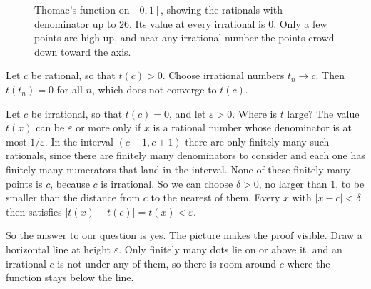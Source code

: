 \begin{figure}
\centering
{}
\caption{Thomae's function on $[0,1]$, showing the rationals with denominator up to $26$.  Its value at every irrational is $0$.  Only a few points are high up, and near any irrational number the points crowd down toward the axis.}
\label{fig:thomae}
\end{figure}

  Let $c$ be rational, so that $t(c) > 0$.  Choose irrational numbers $t_n \to c$.  Then $t(t_n) = 0$ for all $n$, which does not converge to $t(c)$.

  Let $c$ be irrational, so that $t(c) = 0$, and let $\varepsilon > 0$.  Where is $t$ large?  The value $t(x)$ can be $\varepsilon$ or more only if $x$ is a rational number whose denominator is at most $1/\varepsilon$.  In the interval $(c - 1, c + 1)$ there are only finitely many such rationals, since there are finitely many denominators to consider and each one has finitely many numerators that land in the interval.  None of these finitely many points is $c$, because $c$ is irrational.  So we can choose $\delta > 0$, no larger than $1$, to be smaller than the distance from $c$ to the nearest of them.  Every $x$ with $|x - c| < \delta$ then satisfies $|t(x) - t(c)| = t(x) < \varepsilon$.

So the answer to our question is yes.  The picture makes the proof visible.  Draw a horizontal line at height $\varepsilon$.  Only finitely many dots lie on or above it, and an irrational $c$ is not under any of them, so there is room around $c$ where the function stays below the line.

